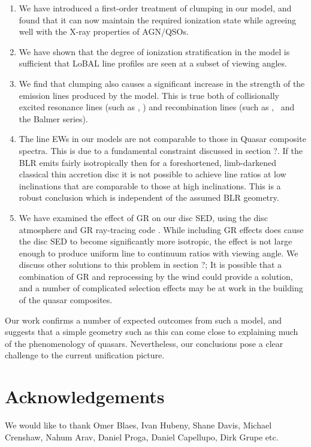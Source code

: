 \documentclass[useAMS,usenatbib]{mn2e_x}
\begin{document}
\begin{enumerate}
\item We have introduced a first-order treatment 
of clumping in our model, and found that it can now maintain
the required ionization state while agreeing well with the X-ray
properties of AGN/QSOs.
\smallskip
\item We have shown that the degree of ionization stratification
in the model is sufficient that LoBAL line profiles
are seen at a subset of viewing angles. 
\smallskip
\item We find that clumping also causes a significant 
increase in the strength of the  emission
lines produced by the model. This is true both
of collisionally excited resonance lines (such as \civ, \nv)
and recombination lines (such as \la, \ha\ and the Balmer series).
\smallskip
\item The line EWs in our models are not comparable to those in Quasar composite
spectra. This is due to a fundamental constraint discussed in section ?. If the BLR
emits fairly isotropically then for a foreshortened, limb-darkened classical thin accretion disc
it is not possible to achieve line ratios at low inclinations that are comparable to
those at high inclinations. This is a robust conclusion which 
is independent of the assumed BLR geometry. 
\smallskip
\item We have examined the effect of GR on our disc SED, using the disc atmosphere
and GR ray-tracing code \agn. While including GR effects
does cause the disc SED to become significantly more isotropic,
the effect is not large enough to produce uniform line to continuum ratios
with viewing angle. We discuss other solutions to this problem in section ?; 
It is possible that a combination of GR and reprocessing by the wind could provide a 
solution, and a number of complicated selection effects may be at work
in the building of the quasar composites.
\end{enumerate}

Our work confirms a number of expected outcomes from such a model, and suggests 
that a simple geometry such as this can come close to explaining much of the 
phenomenology of quasars. Nevertheless, our conclusions pose a clear challenge 
to the current unification picture.


\section*{Acknowledgements}

We would like to thank Omer Blaes, Ivan Hubeny, Shane Davis, 
Michael Crenshaw, Nahum Arav, Daniel Proga, Daniel Capellupo, Dirk Grupe etc.




\newpage
\end{document}
